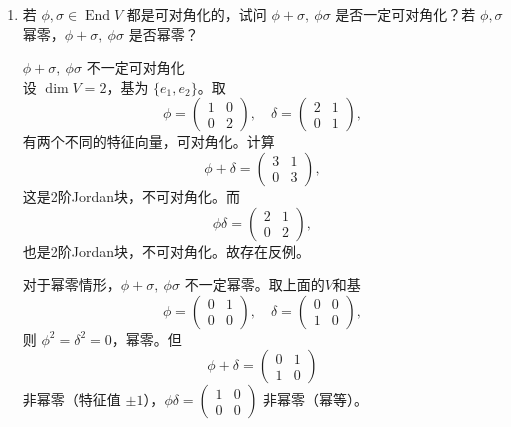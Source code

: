\documentclass[lang=cn,12pt]{elegantbook}
\begin{document}
\begin{example}
\begin{enumerate}
        \item[(2)] 若 \(\phi, \sigma \in \operatorname{End}V\) 都是可对角化的，试问 \(\phi + \sigma,\ \phi\sigma\) 是否一定可对角化？若 \(\phi,\sigma\) 幂零，\(\phi+\sigma,\ \phi\sigma\) 是否幂零？
        \begin{solution}
            \(\phi + \sigma,\ \phi\sigma\) 不一定可对角化 \\
            设 \(\dim V=2\)，基为 \(\{e_1,e_2\}\)。取
            \[
            \phi = \begin{pmatrix} 1 & 0 \\ 0 & 2 \end{pmatrix},\quad 
            \delta = \begin{pmatrix} 2 & 1 \\ 0 & 1 \end{pmatrix},
            \]
            有两个不同的特征向量，可对角化。计算
            \[
            \phi+\delta = \begin{pmatrix} 3 & 1 \\ 0 & 3 \end{pmatrix},
            \]
            这是2阶Jordan块，不可对角化。而
            \[
            \phi\delta = \begin{pmatrix} 2 & 1 \\ 0 & 2 \end{pmatrix},
            \]
            也是2阶Jordan块，不可对角化。故存在反例。
    
            对于幂零情形，\(\phi+\sigma,\ \phi\sigma\) 不一定幂零。取上面的$V$和基
            \[
            \phi = \begin{pmatrix} 0 & 1 \\ 0 & 0 \end{pmatrix},\quad 
            \delta = \begin{pmatrix} 0 & 0 \\ 1 & 0 \end{pmatrix},
            \]
            则 \(\phi^2=\delta^2=0\)，幂零。但
            \[
            \phi+\delta = \begin{pmatrix} 0 & 1 \\ 1 & 0 \end{pmatrix}
            \]
            非幂零（特征值 \(\pm1\)），\(\phi\delta = \begin{pmatrix} 1 & 0 \\ 0 & 0 \end{pmatrix}\) 非幂零（幂等）。
        \end{solution}
    

\end{enumerate}
\end{example}
\end{document}
